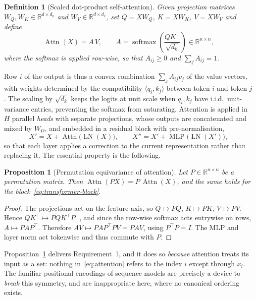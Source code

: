 \documentclass[a4paper,12pt]{article}
\newtheorem{definition}[theorem]{Definition}
\newtheorem{proposition}[theorem]{Proposition}
\theoremstyle{remark}
\DeclareMathOperator{\Attn}{Attn}
\DeclareMathOperator{\softmax}{softmax}
\DeclareMathOperator{\LN}{LN}
\DeclareMathOperator{\MLP}{MLP}
\begin{document}
\begin{definition}[Scaled dot-product self-attention]
\label{def:attention}
Given projection matrices $W_Q,W_K\in\mathbb R^{d\times d_k}$ and $W_V\in\mathbb R^{d\times d_v}$,
set $Q=XW_Q$, $K=XW_K$, $V=XW_V$ and define
\begin{equation}
\label{eq:attention}
\Attn(X)
=
A\,V,
\qquad
A=\softmax\!\left(\frac{QK^\top}{\sqrt{d_k}}\right)
\in\mathbb R^{n\times n},
\end{equation}
where the softmax is applied row-wise, so that $A_{ij}\ge0$ and $\sum_j A_{ij}=1$.
\end{definition}

Row $i$ of the output is thus a convex combination $\sum_j A_{ij}v_j$ of the value
vectors, with weights determined by the compatibility $\langle q_i,k_j\rangle$ between
token $i$ and token $j$. The scaling by $\sqrt{d_k}$ keeps the logits at unit scale when
$q_i,k_j$ have i.i.d.\ unit-variance entries, preventing the softmax from saturating.
Attention is applied in $H$ parallel \emph{heads} with separate projections, whose
outputs are concatenated and mixed by $W_O$, and embedded in a residual block with
pre-normalisation,
\begin{equation}
\label{eq:transformer-block}
X'=X+\Attn\bigl(\LN(X)\bigr),
\qquad
X''=X'+\MLP\bigl(\LN(X')\bigr),
\end{equation}
so that each layer applies a correction to the current representation rather than
replacing it. The essential property is the following.

\begin{proposition}[Permutation equivariance of attention]
\label{prop:perm-equivariance}
Let $P\in\mathbb R^{n\times n}$ be a permutation matrix. Then $\Attn(PX)=P\,\Attn(X)$, and
the same holds for the block~\eqref{eq:transformer-block}.
\end{proposition}

\begin{proof}
The projections act on the feature axis, so $Q\mapsto PQ$, $K\mapsto PK$, $V\mapsto PV$.
Hence $QK^\top\mapsto PQK^\top P^\top$, and since the row-wise softmax acts entrywise on
rows, $A\mapsto PAP^\top$. Therefore $AV\mapsto PAP^\top PV=PAV$, using $P^\top P=I$.
The MLP and layer norm act tokenwise and thus commute with $P$.
\end{proof}

Proposition~\ref{prop:perm-equivariance} delivers Requirement~1, and it does so
\emph{because} attention treats its input as a set: nothing in~\eqref{eq:attention}
refers to the index $i$ except through $x_i$. The familiar positional encodings of
sequence models are precisely a device to \emph{break} this symmetry, and are
inappropriate here, where no canonical ordering exists.
\end{document}
